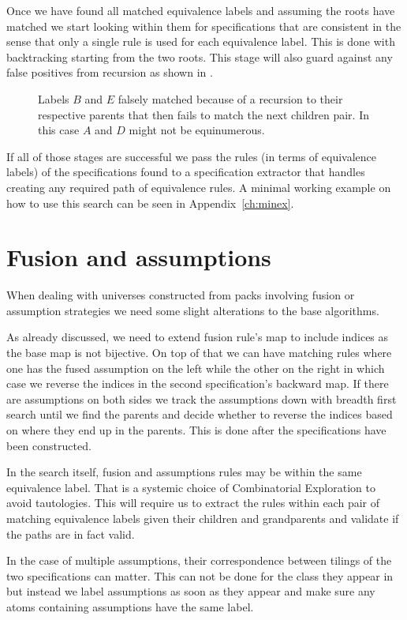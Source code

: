 Once we have found all matched equivalence labels and assuming the roots have matched we start looking within them for specifications that are consistent in the sense that only a single rule is used for each equivalence label. This is done with backtracking starting from the two roots. This stage will also guard against any false positives from recursion as shown in .

\begin{figure}[ht!]
    \centering
    
    \caption{Labels $B$ and $E$ falsely matched because of a recursion to their respective parents that then fails to match the next children pair. In this case $A$ and $D$ might not be equinumerous.}
    \label{fig:recfalsepos}
\end{figure}

If all of those stages are successful we pass the rules (in terms of equivalence labels) of the specifications found to a specification extractor that handles creating any required path of equivalence rules. A minimal working example on how to use this search can be seen in Appendix~\ref{ch:minex}.


\section{Fusion and assumptions}
When dealing with universes constructed from packs involving fusion or assumption strategies we need some slight alterations to the base algorithms. 

As already discussed, we need to extend fusion rule's map to include indices as the base map is not bijective. On top of that we can have matching rules where one has the fused assumption on the left while the other on the right in which case we reverse the indices in the second specification's backward map. If there are assumptions on both sides we track the assumptions down with breadth first search until we find the parents and decide whether to reverse the indices based on where they end up in the parents. This is done after the specifications have been constructed.

In the search itself, fusion and assumptions rules may be within the same equivalence label. That is a systemic choice of Combinatorial Exploration to avoid tautologies. This will require us to extract the rules within each pair of matching equivalence labels given their children and grandparents and validate if the paths are in fact valid.

In the case of multiple assumptions, their correspondence between tilings of the two specifications can matter. This can not be done for the class they appear in but instead we label assumptions as soon as they appear and make sure any atoms containing assumptions have the same label.